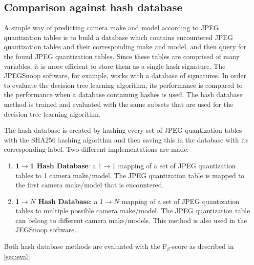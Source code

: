 \subsection{Comparison against hash database}
A simple way of predicting camera make and model according to JPEG quantization tables is to build a database which contains encountered JPEG quantization tables and their corresponding make and model, and then query for the found JPEG quantization tables. Since these tables are comprised of many variables, it is more efficient to store them as a single hash signature. The JPEGSnoop software, for example, works with a database of signatures. In order to evaluate the decision tree learning algorithm, its performance is compared to the performance when a database containing hashes is used. The hash database method is trained and evaluated with the same subsets that are used for the decision tree learning algorithm. 

The hash database is created by hashing every set of JPEG quantization tables with the SHA256 hashing algorithm and then saving this in the database with its corresponding label. Two different implementations are made:
\begin{enumerate}
\item \textbf{1$\rightarrow$1 Hash Database}: a 1$\rightarrow$1 mapping of a set of JPEG quantization tables to 1 camera make/model. The JPEG quantization table is mapped to the first camera make/model that is encountered.
\item \textbf{1$\rightarrow N$ Hash Database}: a 1$\rightarrow N$ mapping of a set of JPEG quantization tables to multiple possible camera make/model. The JPEG quantization table can belong to different camera make/models. This method is also used in the JEGSnoop software. 
\end{enumerate}

Both hash database methods are evaluated with the F$_\beta$-score as described in \autoref{sec:eval}.